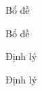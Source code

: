 \documentclass{beamer}
\numberwithin{equation}{section}
\begin{document}
\begin{frame}{Bổ đề}

\begin{block}{Bổ đề}

\end{block}



\end{frame}
\begin{frame}{Định lý}

\begin{block}{Định lý}

\end{block}



\end{frame}
\end{document}

